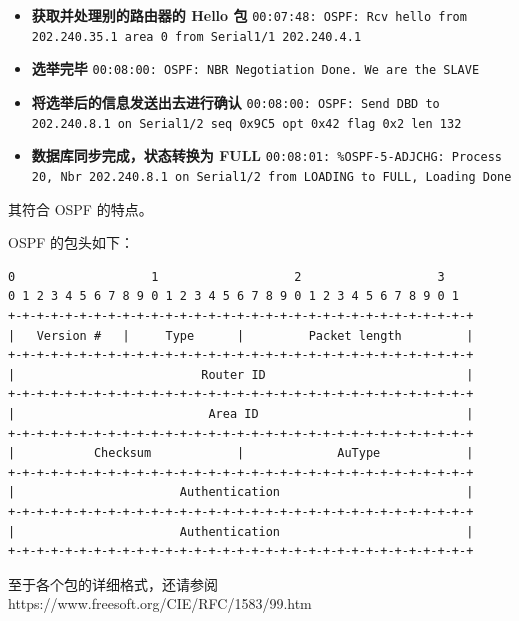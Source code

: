 \documentclass[black,normal,cn]{elegantnote}
\begin{document}
\begin{itemize}
  \item \textbf{获取并处理别的路由器的 Hello 包} \texttt{00:07:48: OSPF: Rcv hello from 202.240.35.1 area 0 from Serial1/1 202.240.4.1}
  \item \textbf{选举完毕} \texttt{00:08:00: OSPF: NBR Negotiation Done. We are the SLAVE}
  \item \textbf{将选举后的信息发送出去进行确认} \texttt{00:08:00: OSPF: Send DBD to 202.240.8.1 on Serial1/2 seq 0x9C5 opt 0x42 flag 0x2 len 132}
  \item \textbf{数据库同步完成，状态转换为 FULL} \texttt{00:08:01: \%OSPF-5-ADJCHG: Process 20, Nbr 202.240.8.1 on Serial1/2 from LOADING to FULL, Loading Done}
\end{itemize}

其符合 OSPF 的特点。

OSPF 的包头如下：

\begin{lstlisting}
0                   1                   2                   3
0 1 2 3 4 5 6 7 8 9 0 1 2 3 4 5 6 7 8 9 0 1 2 3 4 5 6 7 8 9 0 1
+-+-+-+-+-+-+-+-+-+-+-+-+-+-+-+-+-+-+-+-+-+-+-+-+-+-+-+-+-+-+-+-+
|   Version #   |     Type      |         Packet length         |
+-+-+-+-+-+-+-+-+-+-+-+-+-+-+-+-+-+-+-+-+-+-+-+-+-+-+-+-+-+-+-+-+
|                          Router ID                            |
+-+-+-+-+-+-+-+-+-+-+-+-+-+-+-+-+-+-+-+-+-+-+-+-+-+-+-+-+-+-+-+-+
|                           Area ID                             |
+-+-+-+-+-+-+-+-+-+-+-+-+-+-+-+-+-+-+-+-+-+-+-+-+-+-+-+-+-+-+-+-+
|           Checksum            |             AuType            |
+-+-+-+-+-+-+-+-+-+-+-+-+-+-+-+-+-+-+-+-+-+-+-+-+-+-+-+-+-+-+-+-+
|                       Authentication                          |
+-+-+-+-+-+-+-+-+-+-+-+-+-+-+-+-+-+-+-+-+-+-+-+-+-+-+-+-+-+-+-+-+
|                       Authentication                          |
+-+-+-+-+-+-+-+-+-+-+-+-+-+-+-+-+-+-+-+-+-+-+-+-+-+-+-+-+-+-+-+-+
\end{lstlisting}

至于各个包的详细格式，还请参阅 https://www.freesoft.org/CIE/RFC/1583/99.htm
\end{document}

